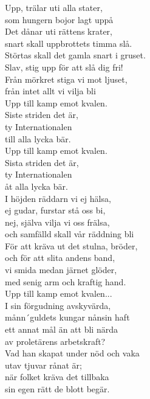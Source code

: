 \vspace{10pt}
Upp, trälar uti alla stater,\\ 
som hungern bojor lagt uppå\\
Det dånar uti rättens krater,\\
snart skall uppbrottets timma slå.\\
Störtas skall det gamla snart i gruset.\\
Slav, stig upp för att slå dig fri!\\
Från mörkret stiga vi mot ljuset,\\
från intet allt vi vilja bli\\
\vspace{10pt}
Upp till kamp emot kvalen.\\
Siste striden det är,\\
ty Internationalen\\
till alla lycka bär.\\
Upp till kamp emot kvalen.\\
Sista striden det är,\\
ty Internationalen\\
åt alla lycka bär.\\
\vspace{10pt}
I höjden räddarn vi ej hälsa,\\
ej gudar, furstar stå oss bi,\\
nej, själva vilja vi oss frälsa,\\
och samfälld skall vår räddning bli\\
För att kräva ut det stulna, bröder,\\
och för att slita andens band,\\
vi smida medan järnet glöder,\\
med senig arm och kraftig hand.\\
\vspace{10pt}
Upp till kamp emot kvalen...\\
\vspace{10pt}
I sin förgudning avskyvärda,\\
månn´guldets kungar nånsin haft\\
ett annat mål än att bli närda\\
av proletärens arbetskraft?\\
Vad han skapat under nöd och vaka\\
utav tjuvar rånat är;\\
när folket kräva det tillbaka\\
sin egen rätt de blott begär.\\
